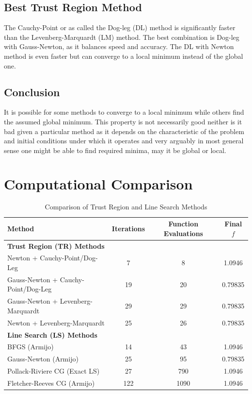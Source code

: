 \documentclass{article}
\begin{document}
\subsection{Best Trust Region Method}
The Cauchy-Point or as called the Dog-leg (DL) method is significantly faster than the Levenberg-Marquardt (LM) method. The best combination is Dog-leg with Gauss-Newton, as it balances speed and accuracy. The DL with Newton method is even faster but can converge to a local minimum instead of the global one. 
\subsection{Conclusion}
It is possible for some methods to converge to a local minimum while others find the assumed global minimum. This property is not necessarily good neither is it bad given a particular method as it depends on the characteristic of the problem and initial conditions under which it operates and very arguably in most general sense one might be able to find required minima, may it be global or local. 
\newpage
\section{Computational Comparison}


\begin{table}[h]
    \centering
    \renewcommand{\arraystretch}{1.2}
    \begin{tabular}{lccc}
        \toprule
        \textbf{Method} & \textbf{Iterations} & \textbf{Function Evaluations} & \textbf{Final \( f \)} \\
        \midrule
        \multicolumn{4}{l}{\textbf{Trust Region (TR) Methods}} \\
        Newton + Cauchy-Point/Dog-Leg & 7 & 8 & 1.0946 \\
        Gauss-Newton + Cauchy-Point/Dog-Leg & 19 & 20 & 0.79835 \\
        Gauss-Newton + Levenberg-Marquardt & 29 & 29 & 0.79835 \\
        Newton + Levenberg-Marquardt & 25 & 26 & 0.79835 \\
        \midrule
        \multicolumn{4}{l}{\textbf{Line Search (LS) Methods}} \\
        BFGS (Armijo) & 14 & 43 & 1.0946 \\
        Gauss-Newton (Armijo) & 25 & 95 & 0.79835 \\
        Pollack-Riviere CG (Exact LS) & 27 & 790 & 1.0946 \\
        Fletcher-Reeves CG (Armijo) & 122 & 1090 & 1.0946 \\
        \bottomrule
    \end{tabular}
    \caption{Comparison of Trust Region and Line Search Methods}
    \label{tab:comparison}
\end{table}
\end{document}
